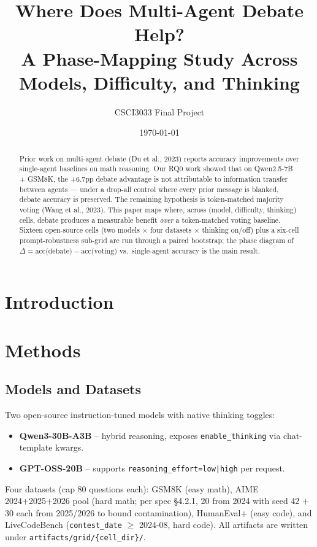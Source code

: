 \documentclass[11pt]{article}
\title{Where Does Multi-Agent Debate Help?\\
\large A Phase-Mapping Study Across Models, Difficulty, and Thinking}
\author{CSCI3033 Final Project}
\date{\today}
\begin{document}
\maketitle

\begin{abstract}
Prior work on multi-agent debate (Du et al., 2023) reports accuracy
improvements over single-agent baselines on math reasoning. Our RQ0
work showed that on Qwen2.5-7B + GSM8K, the +6.7pp debate advantage is
not attributable to information transfer between agents — under a
drop-all control where every prior message is blanked, debate accuracy
is preserved. The remaining hypothesis is token-matched majority
voting (Wang et al., 2023). This paper maps where, across (model,
difficulty, thinking) cells, debate produces a measurable benefit
\emph{over} a token-matched voting baseline. Sixteen open-source
cells (two models $\times$ four datasets $\times$ thinking on/off)
plus a six-cell prompt-robustness sub-grid are run through a paired
bootstrap; the phase diagram of $\Delta = \text{acc(debate)} -
\text{acc(voting)}$ vs.\ single-agent accuracy is the main result.
\end{abstract}

\section{Introduction}
\label{sec:intro}


\section{Methods}
\label{sec:methods}

\subsection{Models and Datasets}
Two open-source instruction-tuned models with native thinking
toggles:
\begin{itemize}
  \item \textbf{Qwen3-30B-A3B} -- hybrid reasoning, exposes
        \texttt{enable\_thinking} via chat-template kwargs.
  \item \textbf{GPT-OSS-20B} -- supports
        \texttt{reasoning\_effort=low|high} per request.
\end{itemize}
Four datasets (cap 80 questions each):
GSM8K (easy math), AIME 2024+2025+2026 pool (hard math; per spec
§4.2.1, 20 from 2024 with seed 42 + 30 each from 2025/2026 to bound
contamination), HumanEval+ (easy code), and LiveCodeBench
(\texttt{contest\_date} $\geq$ 2024-08, hard code). All artifacts are
written under \texttt{artifacts/grid/\{cell\_dir\}/}.
\end{document}
